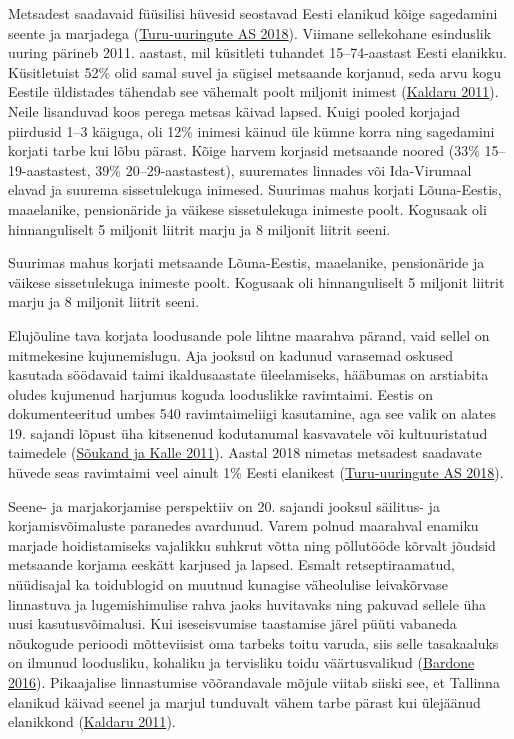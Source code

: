 \documentclass[estonian,]{article}
\begin{document}
Metsadest saadavaid füüsilisi hüvesid seostavad Eesti elanikud kõige sagedamini seente ja marjadega (\protect\hyperlink{Turu-uuringute2018}{Turu-uuringute AS 2018}). Viimane sellekohane esinduslik uuring pärineb 2011. aastast, mil küsitleti tuhandet 15--74-aastast Eesti elanikku. Küsitletuist 52\% olid samal suvel ja sügisel metsaande korjanud, seda arvu kogu Eestile üldistades tähendab see vähemalt poolt miljonit inimest (\protect\hyperlink{Kaldaru2011}{Kaldaru 2011}). Neile lisanduvad koos perega metsas käivad lapsed. Kuigi pooled korjajad piirdusid 1--3 käiguga, oli 12\% inimesi käinud üle kümne korra ning sagedamini korjati tarbe kui lõbu pärast. Kõige harvem korjasid metsaande noored (33\% 15--19-aastastest, 39\% 20--29-aastastest), suuremates linnades või Ida-Virumaal elavad ja suurema sissetulekuga inimesed. Suurimas mahus korjati Lõuna-Eestis, maaelanike, pensionäride ja väikese sissetulekuga inimeste poolt. Kogusaak oli hinnanguliselt 5 miljonit liitrit marju ja 8 miljonit liitrit seeni.

\begin{blockquote-left}
Suurimas mahus korjati metsaande Lõuna-Eestis, maaelanike, pensionäride
ja väikese sissetulekuga inimeste poolt. Kogusaak oli hinnanguliselt 5
miljonit liitrit marju ja 8 miljonit liitrit seeni.
\end{blockquote-left}

Elujõuline tava korjata loodusande pole lihtne maarahva pärand, vaid sellel on mitmekesine kujunemislugu. Aja jooksul on kadunud varasemad oskused kasutada söödavaid taimi ikaldusaastate üleelamiseks, hääbumas on arstiabita oludes kujunenud harjumus koguda looduslikke ravimtaimi. Eestis on dokumenteeritud umbes 540 ravimtaimeliigi kasutamine, aga see valik on alates 19. sajandi lõpust üha kitsenenud kodutanumal kasvavatele või kultuuristatud taimedele (\protect\hyperlink{Suxf5ukand2011}{Sõukand ja Kalle 2011}). Aastal 2018 nimetas metsadest saadavate hüvede seas ravimtaimi veel ainult 1\% Eesti elanikest (\protect\hyperlink{Turu-uuringute2018}{Turu-uuringute AS 2018}).

Seene- ja marjakorjamise perspektiiv on 20. sajandi jooksul säilitus- ja korjamisvõimaluste paranedes avardunud. Varem polnud maarahval enamiku marjade hoidistamiseks vajalikku suhkrut võtta ning põllutööde kõrvalt jõudsid metsaande korjama eeskätt karjused ja lapsed. Esmalt retseptiraamatud, nüüdisajal ka toidublogid on muutnud kunagise väheolulise leivakõrvase linnastuva ja lugemishimulise rahva jaoks huvitavaks ning pakuvad sellele üha uusi kasutusvõimalusi. Kui iseseisvumise taastamise järel püüti vabaneda nõukogude perioodi mõtteviisist oma tarbeks toitu varuda, siis selle tasakaaluks on ilmunud loodusliku, kohaliku ja tervisliku toidu väärtusvalikud (\protect\hyperlink{Bardone2016}{Bardone 2016}). Pikaajalise linnastumise võõrandavale mõjule viitab siiski see, et Tallinna elanikud käivad seenel ja marjul tunduvalt vähem tarbe pärast kui ülejäänud elanikkond (\protect\hyperlink{Kaldaru}{Kaldaru 2011}).
\end{document}
